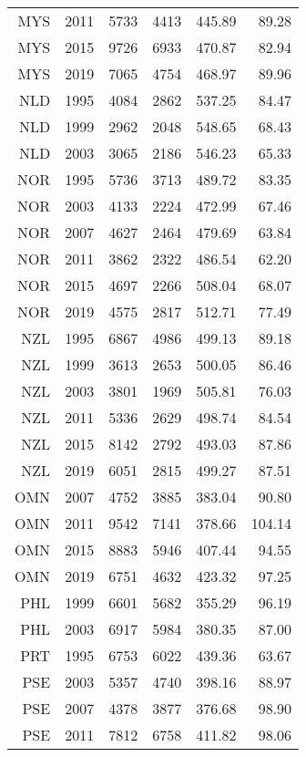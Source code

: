 \begin{longtable}{|r|r|r|r|r|r|}
    MYS   & 2011  & 5733  & 4413  & 445.89 & 89.28 \\
    MYS   & 2015  & 9726  & 6933  & 470.87 & 82.94 \\
    MYS   & 2019  & 7065  & 4754  & 468.97 & 89.96 \\
    NLD   & 1995  & 4084  & 2862  & 537.25 & 84.47 \\
    NLD   & 1999  & 2962  & 2048  & 548.65 & 68.43 \\
    NLD   & 2003  & 3065  & 2186  & 546.23 & 65.33 \\
    NOR   & 1995  & 5736  & 3713  & 489.72 & 83.35 \\
    NOR   & 2003  & 4133  & 2224  & 472.99 & 67.46 \\
    NOR   & 2007  & 4627  & 2464  & 479.69 & 63.84 \\
    NOR   & 2011  & 3862  & 2322  & 486.54 & 62.20 \\
    NOR   & 2015  & 4697  & 2266  & 508.04 & 68.07 \\
    NOR   & 2019  & 4575  & 2817  & 512.71 & 77.49 \\
    NZL   & 1995  & 6867  & 4986  & 499.13 & 89.18 \\
    NZL   & 1999  & 3613  & 2653  & 500.05 & 86.46 \\
    NZL   & 2003  & 3801  & 1969  & 505.81 & 76.03 \\
    NZL   & 2011  & 5336  & 2629  & 498.74 & 84.54 \\
    NZL   & 2015  & 8142  & 2792  & 493.03 & 87.86 \\
    NZL   & 2019  & 6051  & 2815  & 499.27 & 87.51 \\
    OMN   & 2007  & 4752  & 3885  & 383.04 & 90.80 \\
    OMN   & 2011  & 9542  & 7141  & 378.66 & 104.14 \\
    OMN   & 2015  & 8883  & 5946  & 407.44 & 94.55 \\
    OMN   & 2019  & 6751  & 4632  & 423.32 & 97.25 \\
    PHL   & 1999  & 6601  & 5682  & 355.29 & 96.19 \\
    PHL   & 2003  & 6917  & 5984  & 380.35 & 87.00 \\
    PRT   & 1995  & 6753  & 6022  & 439.36 & 63.67 \\
    PSE   & 2003  & 5357  & 4740  & 398.16 & 88.97 \\
    PSE   & 2007  & 4378  & 3877  & 376.68 & 98.90 \\
    PSE   & 2011  & 7812  & 6758  & 411.82 & 98.06 \\

\end{longtable}
